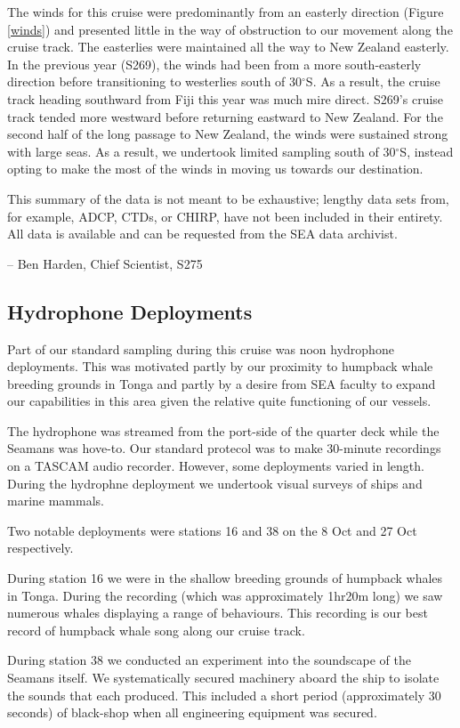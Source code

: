 \documentclass[letterpaper,11pt]{article}
\newcommand{\cruiseID}{S275}
\begin{document}
The winds for this cruise were predominantly from an easterly direction (Figure \ref{winds}) and presented little in the way of obstruction to our movement along the cruise track. The easterlies were maintained all the way to New Zealand easterly. In the previous year (S269), the winds had been from a more south-easterly direction before transitioning to westerlies south of 30$^{\circ}$S. As a result, the cruise track heading southward from Fiji this year was much mire direct. S269's cruise track tended more westward before returning eastward to New Zealand. For the second half of the long passage to New Zealand, the winds were sustained strong with large seas. As a result, we undertook limited sampling south of 30$^{\circ}$S, instead opting to make the most of the winds in moving us towards our destination.

This summary of the data is not meant to be exhaustive; lengthy data sets from, for example, ADCP, CTDs, or CHIRP, have not been included in their entirety. All data is available and can be requested from the SEA data archivist.

-- Ben Harden, Chief Scientist, \cruiseID


\subsection*{Hydrophone Deployments}
Part of our standard sampling during this cruise was noon hydrophone deployments. This was motivated partly by our proximity to humpback whale breeding grounds in Tonga and partly by a desire from SEA faculty to expand our capabilities in this area given the relative quite functioning of our vessels.

The hydrophone was streamed from the port-side of the quarter deck while the Seamans was hove-to. Our standard protecol was to make 30-minute recordings on a TASCAM audio recorder. However, some deployments varied in length. During the hydrophne deployment we undertook visual surveys of ships and marine mammals.

Two notable deployments were stations 16 and 38 on the 8 Oct and 27 Oct respectively.

During station 16 we were in the shallow breeding grounds of humpback whales in Tonga. During the recording (which was approximately 1hr20m long) we saw numerous whales displaying a range of behaviours. This recording is our best record of humpback whale song along our cruise track.

During station 38 we conducted an experiment into the soundscape of the Seamans itself. We systematically secured machinery aboard the ship to isolate the sounds that each produced. This included a short period (approximately 30 seconds) of black-shop when all engineering equipment was secured.
\end{document}
